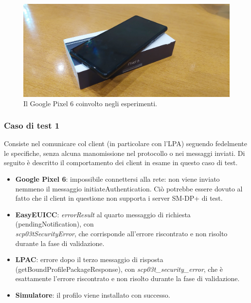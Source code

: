 \documentclass[10pt, oneside]{book}
\begin{document}
\begin{figure}
\includegraphics[width=\linewidth]{pixel6.png}
\caption{Il Google Pixel 6 coinvolto negli esperimenti.}
\label{fig:pixel6}
\end{figure}

\subsubsection{Caso di test 1}
Consiste nel comunicare col client (in particolare con l'LPA) seguendo fedelmente le specifiche, senza alcuna manomissione nel protocollo o nei messaggi inviati. Di seguito è descritto il comportamento dei client in esame in questo caso di test.
\begin{itemize}
\item \textbf{Google Pixel 6}: impossibile connettersi alla rete: non viene inviato nemmeno il messaggio initiateAuthentication. Ciò potrebbe essere dovuto al fatto che il client in questione non supporta i server SM-DP+ di test.
\item \textbf{EasyEUICC}: \textit{errorResult} al quarto messaggio di richiesta (pendingNotification), con\\ \textit{scp03tSecurityError}, che corrisponde all'errore riscontrato e non risolto durante la fase di validazione.
\item \textbf{LPAC}: errore dopo il terzo messaggio di risposta (getBoundProfilePackageResponse), con \textit{scp03t\_security\_error}, che è esattamente l'errore riscontrato e non risolto durante la fase di validazione.
\item \textbf{Simulatore}: il profilo viene installato con successo.
\end{itemize}
\end{document}
